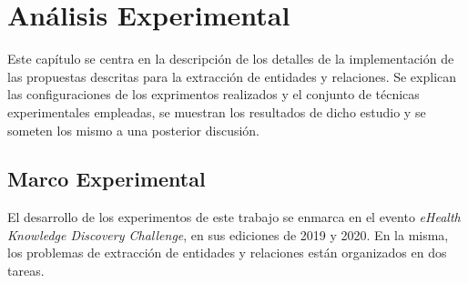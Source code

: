 \chapter{Análisis Experimental}\label{chapter:experiments}

Este capítulo se centra en la descripción de los detalles de la implementación de las propuestas descritas para la extracción de entidades y relaciones.
Se explican las configuraciones de los exprimentos realizados y el conjunto de técnicas experimentales empleadas, se muestran los resultados de dicho estudio y se someten los mismo a una posterior discusión.

\section{Marco Experimental}

El desarrollo de los experimentos de este trabajo se enmarca en el evento \textit{eHealth Knowledge Discovery Challenge}, en sus ediciones de 2019 y 2020.
En la misma, los problemas de extracción de entidades y relaciones están organizados en dos tareas.

